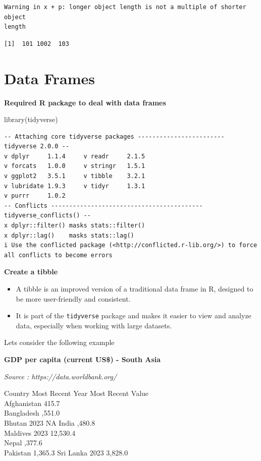 \documentclass[
  letterpaper,
  DIV=11,
  numbers=noendperiod]{scrreprt}
\newenvironment{Shaded}{\begin{snugshade}}{\end{snugshade}}
\newcommand{\FunctionTok}[1]{\textcolor[rgb]{0.28,0.35,0.67}{#1}}
\newcommand{\NormalTok}[1]{\textcolor[rgb]{0.00,0.23,0.31}{#1}}
\begin{document}
\begin{verbatim}
Warning in x + p: longer object length is not a multiple of shorter object
length
\end{verbatim}

\begin{verbatim}
[1]  101 1002  103
\end{verbatim}

\section{Data Frames}\label{data-frames}

\textbf{Required R package to deal with data frames}

\begin{Shaded}
\begin{Highlighting}[]
\FunctionTok{library}\NormalTok{(tidyverse)}
\end{Highlighting}
\end{Shaded}

\begin{verbatim}
-- Attaching core tidyverse packages ------------------------ tidyverse 2.0.0 --
v dplyr     1.1.4     v readr     2.1.5
v forcats   1.0.0     v stringr   1.5.1
v ggplot2   3.5.1     v tibble    3.2.1
v lubridate 1.9.3     v tidyr     1.3.1
v purrr     1.0.2     
-- Conflicts ------------------------------------------ tidyverse_conflicts() --
x dplyr::filter() masks stats::filter()
x dplyr::lag()    masks stats::lag()
i Use the conflicted package (<http://conflicted.r-lib.org/>) to force all conflicts to become errors
\end{verbatim}

\textbf{Create a tibble}

\begin{itemize}
\item
  A tibble is an improved version of a traditional data frame in R,
  designed to be more user-friendly and consistent.
\item
  It is part of the \texttt{tidyverse} package and makes it easier to
  view and analyze data, especially when working with large datasets.
\end{itemize}

Lets consider the following example

\textbf{GDP per capita (current US\$) - South Asia}

\emph{Source : https://data.worldbank.org/}

Country \textbar Most Recent Year\textbar{} Most Recent Value\\
Afghanistan \textbar{} 415.7\\
Bangladesh  ,551.0\\
Bhutan\textbar{} 2023\textbar{} NA India  ,480.8\\
Maldives\textbar{} 2023\textbar{} 12,530.4\\
Nepal  ,377.6\\
Pakistan \textbar{} 1,365.3 Sri Lanka\textbar{}
2023\textbar{} 3,828.0
\end{document}
